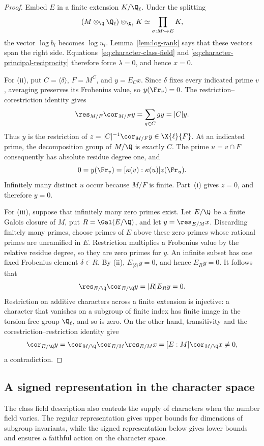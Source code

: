 \begin{proof}
Embed $E$ in a finite extension $K/\Q_\ell$.  Under the splitting
\[
 (M\otimes_\Q\Q_\ell)\otimes_{\Q_\ell}K
   \simeq\prod_{\sigma:M\hookrightarrow E}K,
\]
the vector $\log b_i$ becomes $\log u_i$.
Lemma~\ref{lem:log-rank} says that these vectors span the right
side.  Equations~\eqref{eq:character-class-field} and
\eqref{eq:character-principal-reciprocity} therefore force
$\lambda=0$, and hence $x=0$.

For (ii), put $C=\langle\delta\rangle$, $F=M^C$, and
$y=E_Cx$.  Since $\delta$ fixes every indicated prime $v$, averaging
preserves its Frobenius value, so $y(\Fr_v)=0$.  The
restriction--corestriction identity gives
\[
 \res_{M/F}\cor_{M/F}y=\sum_{g\in C}g y=|C|y.
\]
Thus $y$ is the restriction of
$z=|C|^{-1}\cor_{M/F}y\in\X{\ell}{F}$.  At an indicated prime,
the decomposition group of $M/\Q$ is exactly $C$.  The prime
$u=v\cap F$ consequently has absolute residue degree one, and
\[
 0=y(\Fr_v)=[\kappa(v):\kappa(u)]z(\Fr_u).
\]
Infinitely many distinct $u$ occur because $M/F$ is finite.
Part~(i) gives $z=0$, and therefore $y=0$.

For (iii), suppose that infinitely many zero primes exist.  Let
$E/\Q$ be a finite Galois closure of $M$, put
$R=\Gal(E/\Q)$, and let $y=\res_{E/M}x$.  Discarding finitely
many primes, choose primes of $E$ above these zero primes whose
rational primes are unramified in $E$.  Restriction multiplies a
Frobenius value by the relative residue degree, so they are zero
primes for $y$.  An infinite subset has one fixed Frobenius element
$\delta\in R$.  By (ii),
$E_{\langle\delta\rangle}y=0$, and hence $E_Ry=0$.  It follows that
\[
 \res_{E/\Q}\cor_{E/\Q}y=|R|E_Ry=0.
\]
Restriction on additive characters across a finite extension is
injective: a character that vanishes on a subgroup of finite index
has finite image in the torsion-free group $\Q_\ell$, and so is
zero.  On the other hand, transitivity and the
corestriction--restriction identity give
\[
 \cor_{E/\Q}y
 =\cor_{M/\Q}\cor_{E/M}\res_{E/M}x
 =[E:M]\cor_{M/\Q}x\ne0,
\]
a contradiction.
\end{proof}

\subsection{A signed representation in the character space}

The class field description also controls the supply of characters
when the number field varies.  The regular representation gives upper
bounds for dimensions of subgroup invariants, while the signed
representation below gives lower bounds and ensures a faithful action
on the character space.

